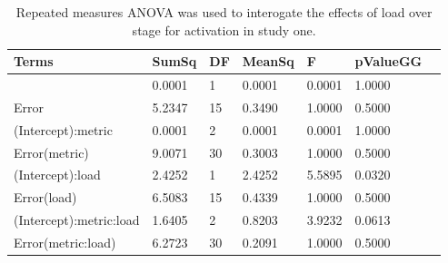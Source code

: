 \begin{table}
\centering
\begin{tabular}[0.2em]{@{}lllllll@{}}\toprule
Terms & SumSq & DF & MeanSq & F & pValueGG\\\toprule[0.2em]
(Intercept) & 0.0001 & 1 & 0.0001 & 0.0001 & 1.0000 \\\midrule
Error & 5.2347 & 15 & 0.3490 & 1.0000 & 0.5000 \\\midrule
(Intercept):metric & 0.0001 & 2 & 0.0001 & 0.0001 & 1.0000 \\\midrule
Error(metric) & 9.0071 & 30 & 0.3003 & 1.0000 & 0.5000 \\\midrule
(Intercept):load & 2.4252 & 1 & 2.4252 & 5.5895 & 0.0320 \\\midrule
Error(load) & 6.5083 & 15 & 0.4339 & 1.0000 & 0.5000 \\\midrule
(Intercept):metric:load & 1.6405 & 2 & 0.8203 & 3.9232 & 0.0613 \\\midrule
Error(metric:load) & 6.2723 & 30 & 0.2091 & 1.0000 & 0.5000 \\\bottomrule[0.2em]
\end{tabular}
\caption{Repeated measures ANOVA was used to interogate the effects of load over stage for activation in study one.\label{tabel:tbl_RMABA2}}
\end{table}
